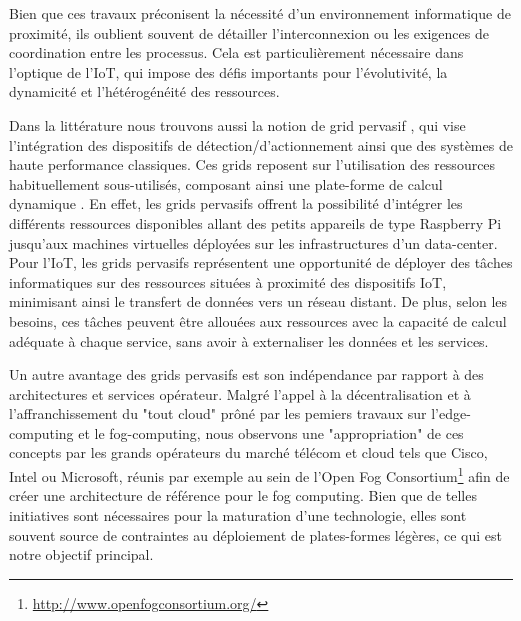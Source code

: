 Bien que ces travaux préconisent la nécessité d'un environnement informatique de proximité, ils oublient souvent de détailler l'interconnexion ou les exigences de coordination entre les processus. Cela est particulièrement nécessaire dans l'optique de l'IoT, qui impose des défis importants pour l'évolutivité, la dynamicité et l'hétérogénéité des ressources. 

Dans la littérature nous trouvons aussi la notion de grid pervasif \cite{Parashar2010}, qui vise l'intégration des dispositifs de détection/d'actionnement ainsi que des systèmes de haute performance classiques. Ces grids reposent sur l'utilisation des ressources habituellement sous-utilisés, composant ainsi une plate-forme de calcul dynamique \cite{Steffenel2015Roma}. En effet, les grids pervasifs offrent la possibilité d'intégrer les différents ressources disponibles allant des petits appareils de type Raspberry Pi jusqu'aux machines virtuelles déployées sur les infrastructures d'un data-center. Pour l'IoT, les grids pervasifs représentent une opportunité de déployer des tâches informatiques sur des ressources situées à proximité des dispositifs IoT, minimisant ainsi le transfert de données vers un réseau distant. De plus, selon les besoins, ces tâches peuvent être allouées aux ressources avec la capacité de calcul adéquate à chaque service, sans avoir à externaliser les données et les services.

Un autre avantage des grids pervasifs est son indépendance par rapport à des architectures et services opérateur. Malgré l'appel à la décentralisation et à l'affranchissement du "tout cloud" prôné par les pemiers travaux sur l'edge-computing et le fog-computing, nous observons une "appropriation" de ces concepts par les grands opérateurs du marché télécom et cloud tels que Cisco, Intel ou Microsoft, réunis par exemple au sein de l'Open Fog Consortium\footnote{\url{http://www.openfogconsortium.org/}} afin de créer une architecture de référence pour le fog computing. Bien que de telles initiatives sont nécessaires pour la maturation d'une technologie, elles sont souvent source de contraintes au déploiement de plates-formes légères, ce qui est notre objectif principal.

